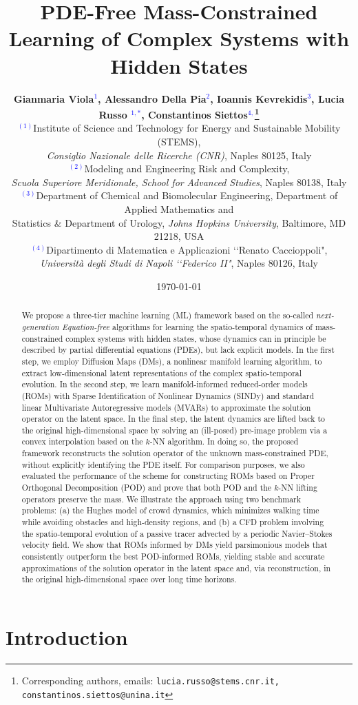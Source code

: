 \documentclass{article}
\title{PDE-Free Mass-Constrained Learning of Complex Systems with Hidden States}
\author{
\textbf{Gianmaria Viola\textcolor{blue}{$^{1}$}, Alessandro Della Pia\textcolor{blue}{$^{2}$}, Ioannis Kevrekidis\textcolor{blue}{$^{3}$}, Lucia Russo \textcolor{blue}{$^{1,*}$}, Constantinos Siettos\textcolor{blue}{$^{4,}$}\thanks{Corresponding authors, emails: \texttt{lucia.russo@stems.cnr.it, constantinos.siettos@unina.it}}}
{}\\
\textcolor{blue}{$^{(1)}$}Institute of Science and Technology for Energy and Sustainable Mobility (STEMS), \\ \emph{Consiglio Nazionale delle Ricerche (CNR)}, Naples 80125, Italy\\
\textcolor{blue}{$^{(2)}$}Modeling and Engineering Risk and Complexity, \\ \emph{Scuola Superiore Meridionale, School for} \emph{Advanced Studies}, Naples 80138, Italy \\
\textcolor{blue}{$^{(3)}$}Department of Chemical and Biomolecular Engineering, Department of Applied Mathematics and \\
\hspace{0.39cm}Statistics \& Department of Urology, \emph{Johns Hopkins University}, Baltimore, MD 21218, USA\\
\textcolor{blue}{$^{(4)}$}Dipartimento di Matematica e Applicazioni ‘‘Renato Caccioppoli", \\ \emph{Universit\`a degli Studi di Napoli} \emph{‘‘Federico II"}, Naples 80126, Italy\\
}
\date{\today}
\begin{document}
\maketitle

\begin{abstract}

We propose a three-tier machine learning (ML) framework based on the so-called \textit{next-generation Equation-free} algorithms for learning the spatio-temporal dynamics of mass-constrained complex systems with hidden states, whose dynamics can in principle be described by partial differential equations (PDEs), but lack explicit models. 
In the first step, we employ Diffusion Maps (DMs), a nonlinear manifold learning algorithm, to extract low-dimensional latent representations of the complex spatio-temporal evolution. In the second step, we learn manifold-informed reduced-order models (ROMs) with Sparse Identification of Nonlinear Dynamics (SINDy) and standard linear Multivariate Autoregressive models (MVARs) to approximate the solution operator on the latent space. In the final step, the latent dynamics are lifted back to the original high-dimensional space by solving an (ill-posed) pre-image problem via a convex interpolation based on the $k$-NN algorithm. In doing so, the proposed framework reconstructs the solution operator of the unknown mass-constrained PDE, without explicitly identifying the PDE itself. For comparison purposes, we also evaluated the performance of the scheme for constructing ROMs based on Proper Orthogonal Decomposition (POD) and prove that both POD and the $k$-NN lifting operators preserve the mass. We illustrate the approach using two benchmark problems: (a) the Hughes model of crowd dynamics, which minimizes walking time while avoiding obstacles and high-density regions, and (b) a CFD problem involving the spatio-temporal evolution of a passive tracer advected by a periodic Navier--Stokes velocity field. We show that ROMs informed by DMs yield parsimonious models that consistently outperform the best POD-informed ROMs, yielding stable and accurate approximations of the solution operator in the latent space and, via reconstruction, in the original high-dimensional space over long time horizons.

\end{abstract}

\section{Introduction}
\label{sec:intro}
\end{document}
